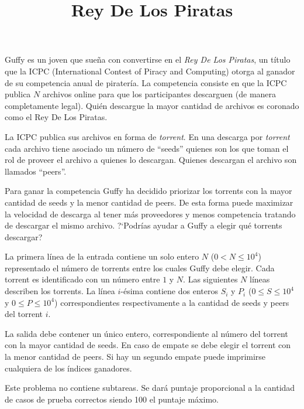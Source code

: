 \documentclass{oci}
\title{Rey De Los Piratas}
\begin{document}
\begin{problemDescription}
    Guffy es un joven que sueña con convertirse en el \emph{Rey De Los Piratas}, un título que la ICPC
    (International Contest of Piracy and Computing) otorga al ganador de su competencia anual de
    piratería.
    La competencia consiste en que la ICPC publica $N$ archivos online para que los participantes
    descarguen (de manera completamente legal).
    Quién descargue la mayor cantidad de archivos es coronado como el Rey De Los Piratas.

    La ICPC publica sus archivos en forma de \emph{torrent}.
    En una descarga por \emph{torrent} cada archivo tiene asociado un número de ``seeds'' quienes
    son los que toman el rol de proveer el archivo a quienes lo descargan.
    Quienes descargan el archivo son llamados ``peers''.

    Para ganar la competencia Guffy ha decidido priorizar los torrents con la mayor cantidad
    de seeds y la menor cantidad de peers.
    De esta forma puede maximizar la velocidad de descarga al tener más proveedores y menos
    competencia tratando de descargar el mismo archivo.
    ?`Podrías ayudar a Guffy a elegir qué torrents descargar?
\end{problemDescription}

\begin{inputDescription}
    La primera línea de la entrada contiene un solo entero $N$ ($0 < N \leq 10^4$)
    representado el número de torrents entre los cuales Guffy debe elegir.
    Cada torrent es identificado con un número entre $1$ y $N$.
    Las siguientes $N$ líneas describen los torrents.
    La línea $i$-ésima contiene dos enteros $S_i$ y $P_i$ ($0 \leq S \leq 10^4$ y $0 \leq P \leq 10^4$)
    correspondientes respectivamente a la cantidad de seeds y peers del torrent $i$.
\end{inputDescription}

\begin{outputDescription}
    La salida debe contener un único entero, correspondiente al número
    del torrent con la mayor cantidad de seeds.
    En caso de empate se debe elegir el torrent con la menor cantidad de peers.
    Si hay un segundo empate puede imprimirse cualquiera de los índices ganadores.
\end{outputDescription}

\begin{scoreDescription}
Este problema no contiene subtareas.
Se dará puntaje proporcional a la cantidad de casos de prueba correctos siendo 100 el puntaje máximo.
\end{scoreDescription}
\end{document}
